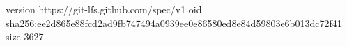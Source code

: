 version https://git-lfs.github.com/spec/v1
oid sha256:ee2d865e88fcd2ad9fb747494a0939ee0e86580ed8e84d59803e6b013dc72f41
size 3627
